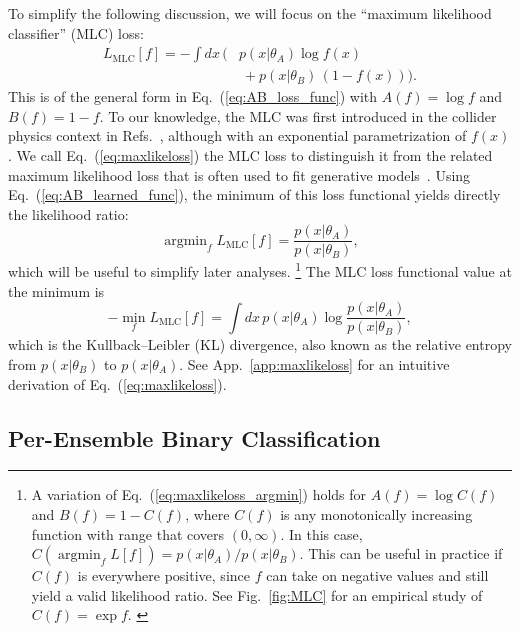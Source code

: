 \documentclass[aps,prx,reprint,preprintnumbers,superscriptaddress,nofootinbib,longbibliography,floatfix]{revtex4-2}
\DeclareMathOperator*{\argmin}{argmin}
\newcommand{\thetaup}{\theta_A}
\newcommand{\thetadown}{\theta_B}
\DeclareRobustCommand{\App}[1]{App.~\ref{app:#1}}
\DeclareRobustCommand{\Fig}[1]{Fig.~\ref{fig:#1}}
\DeclareRobustCommand{\Eq}[1]{Eq.~(\ref{eq:#1})}
\DeclareRobustCommand{\Refs}[1]{Refs.~\cite{#1}}
\begin{document}
To simplify the following discussion, we will focus on the ``maximum likelihood classifier'' (MLC) loss:
%
\begin{align}
\nonumber L_\text{MLC}[f] = - \int dx \, \Big(& p(x|\thetaup) \log f(x) \\
&~ + p(x|\thetadown) \, (1 -f(x)) \Big).
\label{eq:maxlikeloss}
\end{align}
%
This is of the general form in \Eq{AB_loss_func} with $A(f) = \log f$ and $B(f) = 1-f$.
%
To our knowledge, the MLC was first introduced in the collider physics context in \Refs{DAgnolo:2018cun,DAgnolo:2019vbw}, although with an exponential parametrization of $f(x)$.  
%
We call \Eq{maxlikeloss} the MLC loss to distinguish it from the related maximum likelihood loss that is often used to fit generative models~\cite{Andreassen:2018apy,brehmer2020flows,Nachman:2020lpy}.
%
Using \Eq{AB_learned_func}, the minimum of this loss functional yields directly the likelihood ratio:
%
\begin{equation}
\label{eq:maxlikeloss_argmin}
\argmin_f L_\text{MLC}[f] = \frac{p(x|\thetaup)}{p(x|\thetadown)},
\end{equation}
%
which will be useful to simplify later analyses.%
%
\footnote{
A variation of \Eq{maxlikeloss_argmin} holds for $A(f)=\log C(f)$ and $B(f)=1-C(f)$, where $C(f)$ is any monotonically increasing function with range that covers $(0,\infty)$.  In this case, $C(\argmin_f L[f])=p(x|\thetaup)/p(x|\thetadown)$.
%
This can be useful in practice if $C(f)$ is everywhere positive, since $f$ can take on negative values and still yield a valid likelihood ratio.
%
See \Fig{MLC} for an empirical study of $C(f) = \exp f$.
%
\label{footnote:modMLC}
}
%
The MLC loss functional value at the minimum is
%
\begin{equation}
\label{eq:KL_divergence}
- \min_f L_\text{MLC}[f] = \int dx \, p(x|\thetaup) \log \frac{p(x|\thetaup)}{p(x|\thetadown)},
\end{equation}
%
which is the Kullback–Leibler (KL) divergence, also known as the relative entropy from $p(x|\thetadown)$ to $p(x|\thetaup)$.
%
See \App{maxlikeloss} for an intuitive derivation of \Eq{maxlikeloss}.


\subsection{Per-Ensemble Binary Classification}
\label{sec:per_ensemble_classification}
\end{document}
